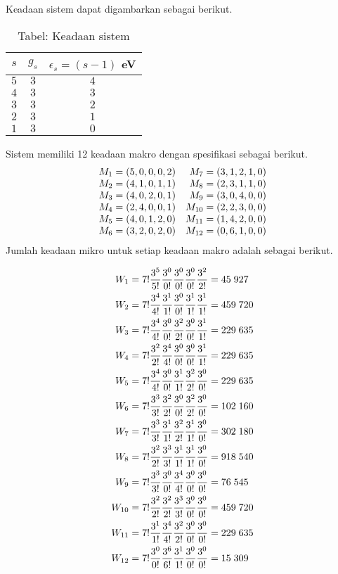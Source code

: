 \documentclass[../../../Main.tex]{subfiles}
\begin{document}
Keadaan sistem dapat digambarkan sebagai berikut.

\begin{table}[h]
    \centering
    \caption*{Tabel: Keadaan sistem}
    \begin{tabular}{ccc}
    \toprule
    $s$ & $g_s$& $\epsilon_s= (s-1)$ eV\\ 
    \midrule
    $5$& $3 $ & $4 $ \\ 
    $4$& $3 $ & $3 $ \\
    $3$& $3 $ & $2 $ \\
    $2$& $3 $ & $1 $\\
    $1$& $3 $ & $0 $\\
    \bottomrule
    \end{tabular}
\end{table}
Sistem memiliki 12 keadaan makro dengan spesifikasi sebagai berikut.
\begin{equation*}
    \begin{array}{l r}
        M_1=(5,0,0,0,2)& M_7=(3,1,2,1,0)\\
        M_2=(4,1,0,1,1)& M_8=(2,3,1,1,0)\\
        M_3=(4,0,2,0,1)& M_9=(3,0,4,0,0)\\
        M_4=(2,4,0,0,1)& M_{10}=(2,2,3,0,0)\\
        M_5=(4,0,1,2,0)&M_{11}=(1,4,2,0,0)\\
        M_6=(3,2,0,2,0)&M_{12}=(0,6,1,0,0)\\
    \end{array}
\end{equation*}
Jumlah keadaan mikro untuk setiap keadaan makro adalah sebagai berikut.

\begin{align*}
    W_1&=7!\dfrac{3^5}{5!}\dfrac{3^0}{0!}\dfrac{3^0}{0!}\dfrac{3^0}{0!}\dfrac{3^2}{2!}=45\;927\\
    W_2&=7!\dfrac{3^4}{4!}\dfrac{3^1}{1!}\dfrac{3^0}{0!}\dfrac{3^1}{1!}\dfrac{3^1}{1!}=459\;720\\
    W_3&=7!\dfrac{3^4}{4!}\dfrac{3^0}{0!}\dfrac{3^2}{2!}\dfrac{3^0}{0!}\dfrac{3^1}{1!}=229\;635\\
    W_4&=7!\dfrac{3^2}{2!}\dfrac{3^4}{4!}\dfrac{3^0}{0!}\dfrac{3^0}{0!}\dfrac{3^1}{1!}=229\;635\\
    W_5&=7!\dfrac{3^4}{4!}\dfrac{3^0}{0!}\dfrac{3^1}{1!}\dfrac{3^2}{2!}\dfrac{3^0}{0!}=229\;635\\
    W_6&=7!\dfrac{3^3}{3!}\dfrac{3^2}{2!}\dfrac{3^0}{0!}\dfrac{3^2}{2!}\dfrac{3^0}{0!}=102\;160\\
    W_7&= 7!\dfrac{3^3}{3!}\dfrac{3^1}{1!}\dfrac{3^2}{2!}\dfrac{3^1}{1!}\dfrac{3^0}{0!}=302\;180\\
    W_8&=7!\dfrac{3^2}{2!}\dfrac{3^3}{3!}\dfrac{3^1}{1!}\dfrac{3^1}{1!}\dfrac{3^0}{0!}=918\;540 \\
    W_9&=7!\dfrac{3^3}{3!}\dfrac{3^0}{0!}\dfrac{3^4}{4!}\dfrac{3^0}{0!}\dfrac{3^0}{0!} =76\;545\\
    W_{10}&=7!\dfrac{3^2}{2!}\dfrac{3^2}{2!}\dfrac{3^3}{3!}\dfrac{3^0}{0!}\dfrac{3^0}{0!} =459\;720\\
    W_{11}&=7!\dfrac{3^1}{1!}\dfrac{3^4}{4!}\dfrac{3^2}{2!}\dfrac{3^0}{0!}\dfrac{3^0}{0!} =229\;635\\
    W_{12}&=7!\dfrac{3^0}{0!}\dfrac{3^6}{6!}\dfrac{3^1}{1!}\dfrac{3^0}{0!}\dfrac{3^0}{0!} =15\;309
\end{align*}
\end{document}

